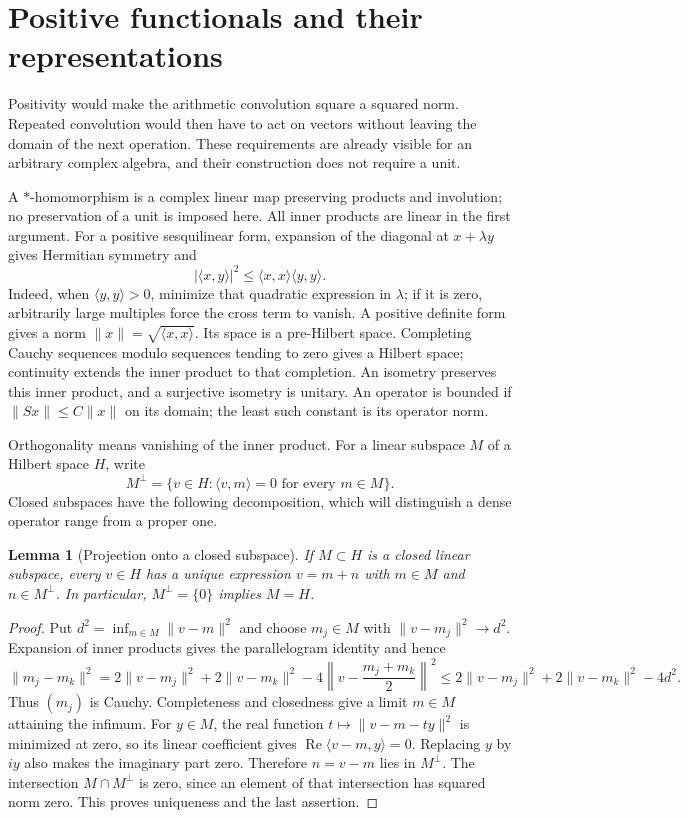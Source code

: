 \documentclass[11pt]{article}
\newtheorem{lemma}[theorem]{Lemma}
\theoremstyle{definition}
\theoremstyle{remark}
\numberwithin{equation}{section}
\begin{document}
\section{Positive functionals and their representations}

Positivity would make the arithmetic convolution square a squared norm.
Repeated convolution would then have to act on vectors without leaving the
domain of the next operation.  These requirements are already visible for
an arbitrary complex algebra, and their construction does not require a unit.

A $*$-homomorphism is a complex linear map preserving
products and involution; no preservation of a unit is imposed here.
All inner products are linear in the first argument.
For a positive sesquilinear form, expansion of the diagonal at
$x+\lambda y$ gives
Hermitian symmetry and
\[
 |\langle x,y\rangle|^2\leq\langle x,x\rangle\langle y,y\rangle.
\]
Indeed, when $\langle y,y\rangle>0$, minimize that quadratic expression in
$\lambda$; if it is zero, arbitrarily large multiples force the cross term
to vanish.  A positive definite form gives a norm
$\|x\|=\sqrt{\langle x,x\rangle}$.  Its space is a pre-Hilbert space.
Completing Cauchy sequences modulo sequences tending to zero gives a
Hilbert space; continuity extends the inner product to that completion.
An isometry preserves this inner product, and a surjective isometry is
unitary.  An operator is bounded if $\|Sx\|\leq C\|x\|$ on its domain;
the least such constant is its operator norm.

Orthogonality means vanishing of the inner product.  For a linear subspace
$M$ of a Hilbert space $H$, write
\[
 M^\perp=\{v\in H:\langle v,m\rangle=0\text{ for every }m\in M\}.
\]
Closed subspaces have the following decomposition, which will distinguish
a dense operator range from a proper one.

\begin{lemma}[Projection onto a closed subspace]
\label{lem:weil-orthogonal-decomposition}
If $M\subset H$ is a closed linear subspace, every $v\in H$ has a unique
expression $v=m+n$ with $m\in M$ and $n\in M^\perp$.
In particular, $M^\perp=\{0\}$ implies $M=H$.
\end{lemma}
\begin{proof}
Put $d^2=\inf_{m\in M}\|v-m\|^2$ and choose $m_j\in M$ with
$\|v-m_j\|^2\to d^2$.  Expansion of inner products gives the
parallelogram identity and hence
\[
 \|m_j-m_k\|^2
 =2\|v-m_j\|^2+2\|v-m_k\|^2
      -4\left\|v-\frac{m_j+m_k}{2}\right\|^2
 \leq2\|v-m_j\|^2+2\|v-m_k\|^2-4d^2.
\]
Thus $(m_j)$ is Cauchy.  Completeness and closedness give a limit
$m\in M$ attaining the infimum.
For $y\in M$, the real function $t\mapsto\|v-m-ty\|^2$ is minimized
at zero, so its linear coefficient gives
$\operatorname{Re}\langle v-m,y\rangle=0$.
Replacing $y$ by $iy$ also makes the imaginary part zero.
Therefore $n=v-m$ lies in $M^\perp$.
The intersection $M\cap M^\perp$ is zero, since an element of that
intersection has squared norm zero.  This proves uniqueness and the
last assertion.
\end{proof}
\end{document}
